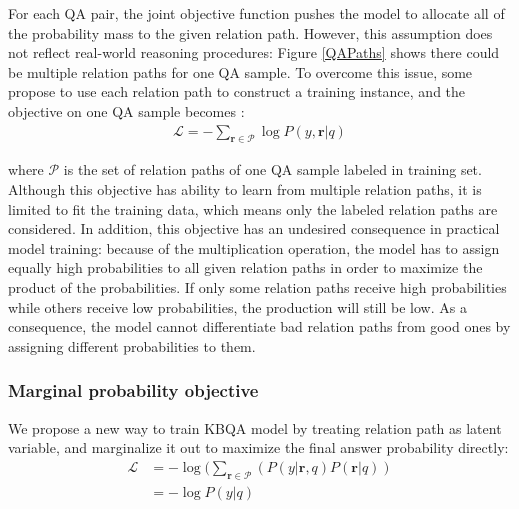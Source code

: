 For each QA pair, the joint objective function pushes the model to allocate all of the probability mass to the given relation path. However, this assumption does not reflect real-world reasoning procedures: Figure \ref{QAPaths} shows there could be multiple relation paths for one QA sample. 
To overcome this issue, some propose to use each relation path to construct a training instance, and the objective on one QA sample becomes :
\begin{align}
\mathcal{L} = -\sum_{\mathbf{r}\in \mathcal{P}}\log P(y,\mathbf{r}|q)
\end{align}

where $\mathcal{P}$ is the set of relation paths of one QA sample labeled in training set. Although this objective has ability to learn from multiple relation paths, it is limited to fit the training data, which means only the labeled relation paths are considered.
 In addition, this objective has an undesired consequence in practical model training: because of the multiplication operation, the model has to assign equally high probabilities to all given relation paths in order to maximize the product of the probabilities. If only some relation paths receive high probabilities while others receive low probabilities, the production will still be low. As a consequence, the model cannot differentiate bad relation paths from good ones by assigning different probabilities to them.

\subsubsection{Marginal probability objective} We propose a new way to train KBQA model by treating relation path as latent variable, and marginalize it out to maximize the final answer probability directly:
\begin{equation}
\begin{aligned}
\mathcal{L} &=  -\log(\sum_{\mathbf{r}\in \mathcal{P}}( P(y|\mathbf{r},q)P(\mathbf{r}|q))\\
            &= -\log P(y|q)
\end{aligned}
\label{obj:latent}
\end{equation}

